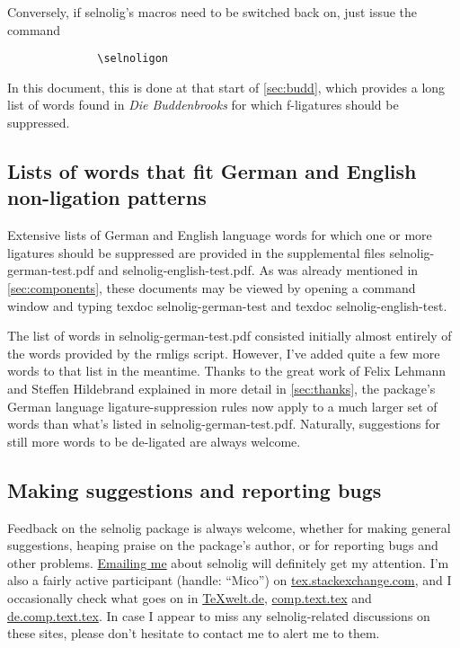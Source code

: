 \documentclass[11pt]{article}
\newcommand{\pkg}[1]{\textsf{#1}}
\begin{document}
Conversely, if \pkg{selnolig}'s macros need to be switched back on, just issue the command
\begin{Verbatim}
              \selnoligon
\end{Verbatim}
In this document, this is done at that start of \cref{sec:budd}, which provides a long list of words found in \emph{Die Buddenbrooks} for which f-ligatures should be suppressed.

\subsection{Lists of words that fit German and English non-ligation patterns} \label{sec:lists}

Extensive lists of German and English language words for which one or more ligatures should be suppressed are provided in the supplemental files \pkg{selnolig-german-test.pdf} and \pkg{selnolig-english-test.pdf}. As was already mentioned in \cref{sec:components}, these documents may be viewed by opening a command window and typing \pkg{texdoc selnolig-german-test} and \pkg{texdoc selnolig-english-test}.

The list of words in \pkg{selnolig-german-test.pdf} consisted initially almost entirely of the words provided by the \pkg{rmligs} script. However, I've added quite a few more words to that list in the meantime. Thanks to the great work of Felix Lehmann and Steffen Hildebrand explained in more detail in \cref{sec:thanks}, the package's German language ligature-suppression rules now apply to a much larger set of words than what's listed in \pkg{selnolig-german-test.pdf}. Naturally, suggestions for still more words to be de-ligated are always welcome.



\subsection{Making suggestions and reporting bugs}

Feedback on the \pkg{selnolig} package is always welcome, whether for making general suggestions, heaping praise on the package's author, or for reporting bugs and other problems. \href{mailto:loretan.mico@gmail.com}{Emailing me} about \pkg{selnolig} will definitely get my attention. I'm also a fairly active participant (handle: \enquote{Mico}) on \href{http://tex.stackexchange.com/}{tex.stackexchange.com}, and I occasionally check what goes on in \href{http://texwelt.de/wissen/}{TeXwelt.de}, \href{https://groups.google.com/forum/?fromgroups#!forum/comp.text.tex}{comp.text.tex} and \href{https://groups.google.com/forum/#!forum/de.comp.text.tex}{de.comp.text.tex}. In case I appear to miss any \pkg{selnolig}-related discussions on these sites, please don't hesitate to contact me to alert me to them. 
\end{document}
